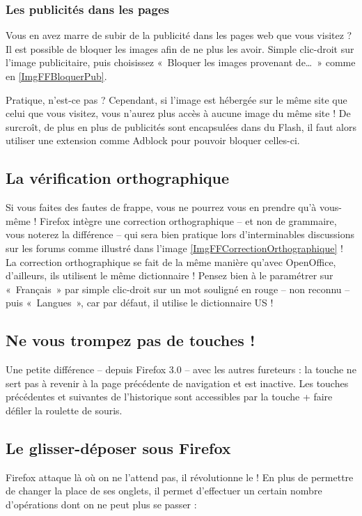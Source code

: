 \subsubsection{Les publicités dans les pages}
Vous en avez marre de subir de la publicité dans les pages web que vous visitez ? Il est possible de bloquer les images afin de ne plus les avoir. Simple clic-droit sur l'image publicitaire, puis choisissez «~Bloquer les images provenant de\ldots{}~» comme en \ref{ImgFFBloquerPub}.\par
{}
Pratique, n'est-ce pas ? Cependant, si l'image est hébergée sur le même site que celui que vous visitez, vous n'aurez plus accès à aucune image du même site ! De surcroît, de plus en plus de publicités sont encapsulées dans du Flash, il faut alors utiliser une extension comme Adblock pour pouvoir bloquer celles-ci.
\subsection{La vérification orthographique}
Si vous faites des fautes de frappe, vous ne pourrez vous en prendre qu'à vous-même ! Firefox intègre une correction orthographique -- et non de grammaire, vous noterez la différence -- qui sera bien pratique lors d'interminables discussions sur les forums comme illustré dans l'image \ref{ImgFFCorrectionOrthographique} ! La correction orthographique se fait de la même manière qu'avec OpenOffice, d'ailleurs, ils utilisent le même dictionnaire ! Pensez bien à le paramétrer sur «~Français~» par simple clic-droit sur un mot souligné en rouge -- non reconnu -- puis «~Langues~», car par défaut, il utilise le dictionnaire US !
\subsection{Ne vous trompez pas de touches !}
Une petite différence -- depuis Firefox 3.0 -- avec les autres fureteurs : la touche  ne sert pas à revenir à la page précédente de navigation et est inactive. Les touches précédentes et suivantes de l'historique sont accessibles par la touche  + faire défiler la roulette de souris.
\subsection{Le glisser-déposer sous Firefox}
Firefox attaque là où on ne l'attend pas, il révolutionne le  ! En plus de permettre de changer la place de ses onglets, il permet d'effectuer un certain nombre d'opérations dont on ne peut plus se passer :
